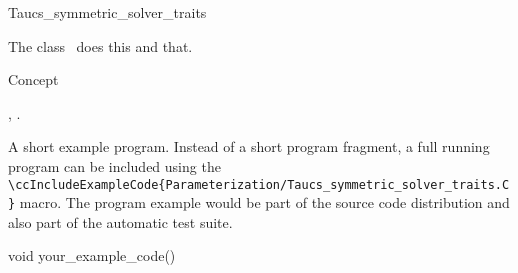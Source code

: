 

\begin{ccRefClass}{Taucs_symmetric_solver_traits}  %


\ccDefinition
  
The class \ccRefName\ does this and that.


\ccIsModel

Concept

\ccTypes


\ccCreation
{}  %


\ccOperations


\ccSeeAlso

,
.

\ccExample

A short example program.
Instead of a short program fragment, a full running program can be
included using the 
\verb|\ccIncludeExampleCode{Parameterization/Taucs_symmetric_solver_traits.C}| 
macro. The program example would be part of the source code distribution and
also part of the automatic test suite.

\begin{ccExampleCode}
void your_example_code() {
}
\end{ccExampleCode}


\end{ccRefClass}


